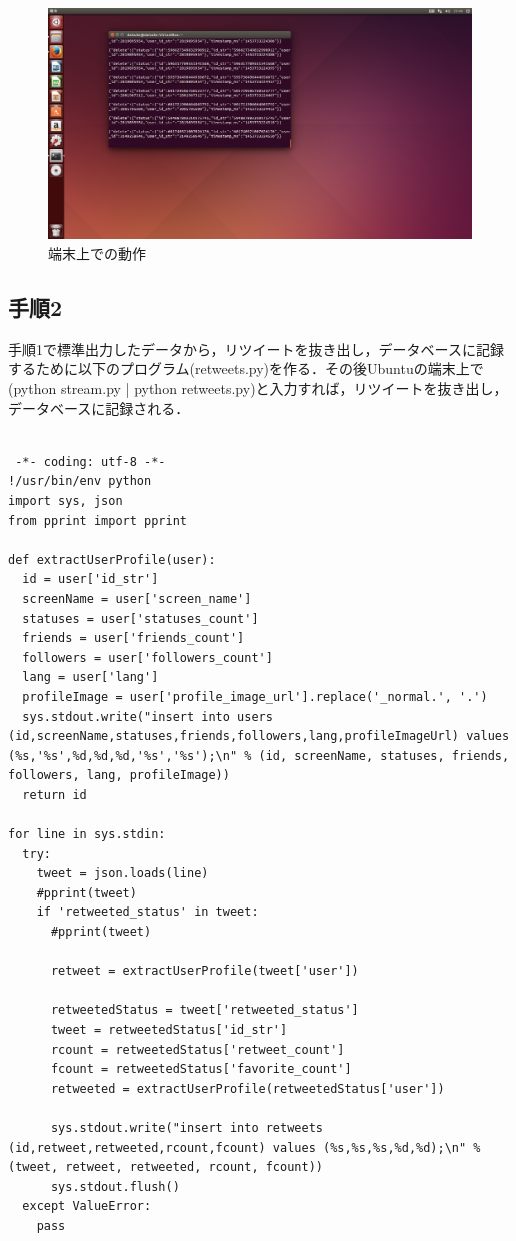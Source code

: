 \begin{figure}[H]
\centering
\includegraphics[width=15cm]{streampy.png}
\caption{端末上での動作}\label{stream.pyの画像}
\end{figure}



\subsection{手順2}
手順1で標準出力したデータから，リツイートを抜き出し，データベースに記録するために以下のプログラム(retweets.py)を作る．その後Ubuntuの端末上で(python stream.py | python retweets.py)と入力すれば，リツイートを抜き出し，データベースに記録される．

\begin{lstlisting}

 -*- coding: utf-8 -*-
!/usr/bin/env python
import sys, json
from pprint import pprint

def extractUserProfile(user):
  id = user['id_str']
  screenName = user['screen_name']
  statuses = user['statuses_count']
  friends = user['friends_count']
  followers = user['followers_count']
  lang = user['lang']
  profileImage = user['profile_image_url'].replace('_normal.', '.')
  sys.stdout.write("insert into users (id,screenName,statuses,friends,followers,lang,profileImageUrl) values (%s,'%s',%d,%d,%d,'%s','%s');\n" % (id, screenName, statuses, friends, followers, lang, profileImage))
  return id

for line in sys.stdin:
  try:
    tweet = json.loads(line)
    #pprint(tweet)
    if 'retweeted_status' in tweet:
      #pprint(tweet)
      
      retweet = extractUserProfile(tweet['user'])
      
      retweetedStatus = tweet['retweeted_status']
      tweet = retweetedStatus['id_str']
      rcount = retweetedStatus['retweet_count']
      fcount = retweetedStatus['favorite_count']
      retweeted = extractUserProfile(retweetedStatus['user'])

      sys.stdout.write("insert into retweets (id,retweet,retweeted,rcount,fcount) values (%s,%s,%s,%d,%d);\n" % (tweet, retweet, retweeted, rcount, fcount))
      sys.stdout.flush()
  except ValueError:
    pass

\end{lstlisting}

